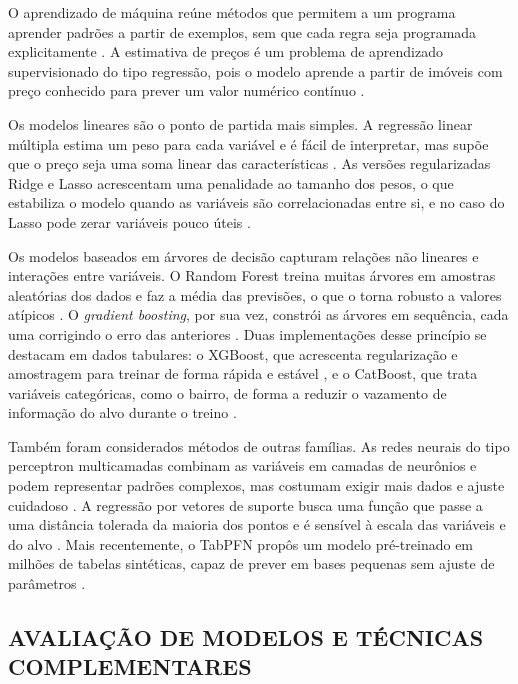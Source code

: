 \documentclass[
  article,
  a4paper,
  12pt,
  fleqn,
  oneside,
  chapter = TITLE,
  section = TITLE,
]{abntex2}
\begin{document}
O aprendizado de máquina reúne métodos que permitem a um programa aprender padrões a partir de exemplos, sem que cada regra seja programada explicitamente \cite{russell2021}. A estimativa de preços é um problema de aprendizado supervisionado do tipo regressão, pois o modelo aprende a partir de imóveis com preço conhecido para prever um valor numérico contínuo \cite{james2021}.

Os modelos lineares são o ponto de partida mais simples. A regressão linear múltipla estima um peso para cada variável e é fácil de interpretar, mas supõe que o preço seja uma soma linear das características \cite{hastie2009}. As versões regularizadas Ridge e Lasso acrescentam uma penalidade ao tamanho dos pesos, o que estabiliza o modelo quando as variáveis são correlacionadas entre si, e no caso do Lasso pode zerar variáveis pouco úteis \cite{hoerl1970,tibshirani1996}.

Os modelos baseados em árvores de decisão capturam relações não lineares e interações entre variáveis. O Random Forest treina muitas árvores em amostras aleatórias dos dados e faz a média das previsões, o que o torna robusto a valores atípicos \cite{breiman2001}. O \textit{gradient boosting}, por sua vez, constrói as árvores em sequência, cada uma corrigindo o erro das anteriores \cite{friedman2001}. Duas implementações desse princípio se destacam em dados tabulares: o XGBoost, que acrescenta regularização e amostragem para treinar de forma rápida e estável \cite{chen2016}, e o CatBoost, que trata variáveis categóricas, como o bairro, de forma a reduzir o vazamento de informação do alvo durante o treino \cite{prokhorenkova2018}.

Também foram considerados métodos de outras famílias. As redes neurais do tipo perceptron multicamadas combinam as variáveis em camadas de neurônios e podem representar padrões complexos, mas costumam exigir mais dados e ajuste cuidadoso \cite{geron2019}. A regressão por vetores de suporte busca uma função que passe a uma distância tolerada da maioria dos pontos e é sensível à escala das variáveis e do alvo \cite{drucker1997}. Mais recentemente, o TabPFN propôs um modelo pré-treinado em milhões de tabelas sintéticas, capaz de prever em bases pequenas sem ajuste de parâmetros \cite{hollmann2025}.

\subsection{AVALIAÇÃO DE MODELOS E TÉCNICAS COMPLEMENTARES}
\end{document}
